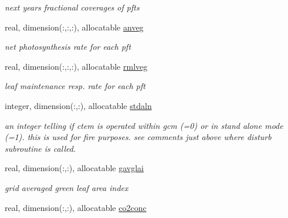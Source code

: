 \begin{DoxyCompactItemize}
\begin{DoxyCompactList}\small\item\em next year\textquotesingle{}s fractional coverages of pfts \end{DoxyCompactList}\item 
\hypertarget{structctem__statevars_1_1veg__rot_a7fc90aaea872511783bb17ef696acfff}{}real, dimension(\+:,\+:,\+:), allocatable \hyperlink{structctem__statevars_1_1veg__rot_a7fc90aaea872511783bb17ef696acfff}{anveg}\label{structctem__statevars_1_1veg__rot_a7fc90aaea872511783bb17ef696acfff}

\begin{DoxyCompactList}\small\item\em net photosynthesis rate for each pft \end{DoxyCompactList}\item 
\hypertarget{structctem__statevars_1_1veg__rot_a8bea7d05bf9c9ddd7015c15d3ec1312c}{}real, dimension(\+:,\+:,\+:), allocatable \hyperlink{structctem__statevars_1_1veg__rot_a8bea7d05bf9c9ddd7015c15d3ec1312c}{rmlveg}\label{structctem__statevars_1_1veg__rot_a8bea7d05bf9c9ddd7015c15d3ec1312c}

\begin{DoxyCompactList}\small\item\em leaf maintenance resp. rate for each pft \end{DoxyCompactList}\item 
\hypertarget{structctem__statevars_1_1veg__rot_a42865f61a176692352b0306213394c03}{}integer, dimension(\+:,\+:), allocatable \hyperlink{structctem__statevars_1_1veg__rot_a42865f61a176692352b0306213394c03}{stdaln}\label{structctem__statevars_1_1veg__rot_a42865f61a176692352b0306213394c03}

\begin{DoxyCompactList}\small\item\em an integer telling if ctem is operated within gcm (=0) or in stand alone mode (=1). this is used for fire purposes. see comments just above where disturb subroutine is called. \end{DoxyCompactList}\item 
\hypertarget{structctem__statevars_1_1veg__rot_ad8f483539e6a6f7b925c65ec5ca40f87}{}real, dimension(\+:,\+:), allocatable \hyperlink{structctem__statevars_1_1veg__rot_ad8f483539e6a6f7b925c65ec5ca40f87}{gavglai}\label{structctem__statevars_1_1veg__rot_ad8f483539e6a6f7b925c65ec5ca40f87}

\begin{DoxyCompactList}\small\item\em grid averaged green leaf area index \end{DoxyCompactList}\item 
\hypertarget{structctem__statevars_1_1veg__rot_a7b10a76c4325beafbae62c559a973bd1}{}real, dimension(\+:,\+:), allocatable \hyperlink{structctem__statevars_1_1veg__rot_a7b10a76c4325beafbae62c559a973bd1}{co2conc}\label{structctem__statevars_1_1veg__rot_a7b10a76c4325beafbae62c559a973bd1}


\end{DoxyCompactItemize}
